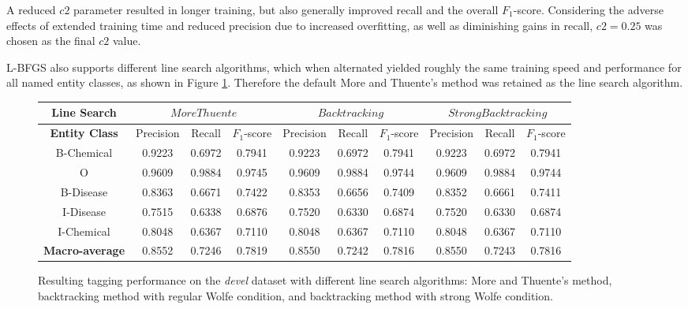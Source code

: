 \documentclass[10pt, oneside]{article}
\begin{document}
A reduced $c2$ parameter resulted in longer training, but also generally improved recall and the overall $F_1$-score. Considering the adverse effects of extended training time and reduced precision due to increased overfitting, as well as diminishing gains in recall, $c2=0.25$ was chosen as the final $c2$ value.

L-BFGS also supports different line search algorithms, which when alternated yielded roughly the same training speed and performance for all named entity classes, as shown in Figure \ref{fig:linesearch}. Therefore the default More and Thuente's method was retained as the line search algorithm.

\begin{figure}[h]
\begin{center}
\fontsize{9}{11}\selectfont
\begin{tabular}{|*{10}{c|}}\hline
\textbf{Line Search}  & \multicolumn{3}{c|}{$MoreThuente$} & \multicolumn{3}{c|}{$Backtracking$} & \multicolumn{3}{c|}{$StrongBacktracking$}  \\ \hline 
\textbf{Entity Class} & Precision & Recall & $F_1$-score & Precision & Recall & $F_1$-score & Precision & Recall & $F_1$-score \\ \hline
B-Chemical & 0.9223 & 0.6972 & 0.7941 & 0.9223 & 0.6972 & 0.7941 & 0.9223 & 0.6972 & 0.7941 \\ \hline
O                 & 0.9609 & 0.9884 & 0.9745 & 0.9609 & 0.9884 & 0.9744 & 0.9609 & 0.9884 & 0.9744 \\ \hline
B-Disease   & 0.8363 & 0.6671 & 0.7422 & 0.8353 & 0.6656 & 0.7409 & 0.8352 & 0.6661 & 0.7411 \\ \hline
I-Disease    & 0.7515 & 0.6338 & 0.6876 & 0.7520 & 0.6330 & 0.6874 & 0.7520 & 0.6330 & 0.6874 \\ \hline
I-Chemical  & 0.8048 & 0.6367 & 0.7110 & 0.8048 & 0.6367 & 0.7110 & 0.8048 & 0.6367 & 0.7110 \\ \hline
\textbf{Macro-average} & 0.8552 & 0.7246 & 0.7819 & 0.8550 & 0.7242 & 0.7816 & 0.8550 & 0.7243 & 0.7816 \\ \hline
\end{tabular}
\caption{\label{fig:linesearch} Resulting tagging performance on the \emph{devel} dataset with different line search algorithms: More and Thuente's method, backtracking method with regular Wolfe condition, and backtracking method with strong Wolfe condition.}
\end{center}
\end{figure}
\end{document}
